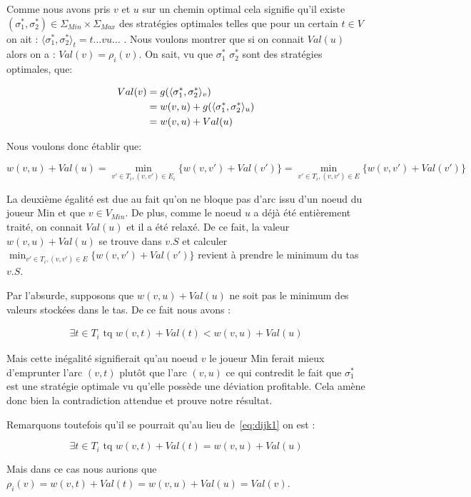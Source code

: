 \begin{demonstration}
$\text{}$\\
	Comme nous avons pris $v$ et $u$ sur un chemin optimal cela signifie qu'il existe $(\sigma_1^*, \sigma_2^*) \in \Sigma_{Min} \times \Sigma_{Max}$ des stratégies optimales telles que pour un certain $t \in V$ on ait : $\langle \sigma_1^*, \sigma_2^* \rangle_t = t\ldots vu\ldots$ .
Nous voulons montrer que si on connait $Val(u)$ alors on a : $Val(v) = \rho_i(v)$.
On sait, vu que $\sigma_1^*$ $ \sigma_2^*$ sont des stratégies optimales, que:

\begin{align*}
Val(v) &= g(\langle \sigma_1^*,\sigma_2^* \rangle_v) \notag \\
 	   &= w(v,u) + g(\langle \sigma_1^*,\sigma_2^* \rangle_u) \notag \\
       &= w(v,u) + Val(u) 
\end{align*}

Nous voulons donc établir que:

$$ w(v,u) + Val(u) = \min_{v' \in T_i, (v,v') \in E_i} \{ w(v,v') + Val(v') \} = \min_{v' \in T_i, (v,v') \in E} \{ w(v,v') + Val(v') \}$$

La deuxième égalité est due au fait qu'on ne bloque pas d'arc issu d'un noeud du joueur Min et que $v\in V_{Min}$.
De plus, comme le noeud $u$ a déjà été entièrement traité, on connait $Val(u)$ et il a été relaxé. De ce fait, la valeur $w(v,u) + Val(u)$ se trouve dans $v.S$ et calculer $\min_{v' \in T_i, (v,v') \in E} \{ w(v,v') + Val(v') \}$ revient à prendre le minimum du tas $v.S$.

Par l'absurde, supposons que $ w(v,u) + Val(u)$ ne soit pas le minimum des valeurs stockées dans le tas. De ce fait nous avons :

\begin{align} \exists t \in T_i \text{ tq } w(v,t) + Val(t) < w(v,u) + Val(u) \label{eq:dijk1} \end{align}

Mais cette inégalité signifierait qu'au noeud $v$ le joueur Min ferait mieux d'emprunter l'arc $(v,t)$ plutôt que l'arc $(v,u)$ ce qui contredit le fait que $\sigma_1^*$ est une stratégie optimale vu qu'elle possède une déviation profitable. Cela amène donc bien la contradiction attendue et prouve notre résultat.

Remarquons toutefois qu'il se pourrait qu'au lieu de~\eqref{eq:dijk1} on est : 

$$ \exists t \in T_i \text{ tq } w(v,t) + Val(t) = w(v,u) + Val(u) $$

Mais dans ce cas nous aurions que $\rho_i(v)= w(v,t) + Val(t) = w(v,u) + Val(u) = Val(v)$. 

\end{demonstration}


